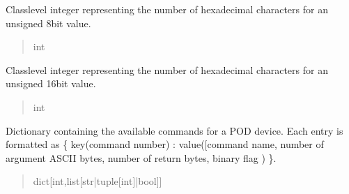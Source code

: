 \documentclass[letterpaper,10pt,english]{sphinxmanual}
\begin{document}
\begin{fulllineitems}
\begin{fulllineitems}
\begin{quote}
\begin{description}
\end{description}\end{quote}

\end{fulllineitems}


\begin{fulllineitems}
\label{\detokenize{PodCommands:PodCommands.POD_Commands.__U8}}
\pysigstartsignatures
{}
\pysigstopsignatures
\sphinxAtStartPar
Class\sphinxhyphen{}level integer representing the number of hexadecimal characters for an unsigned             8\sphinxhyphen{}bit value.
\begin{quote}\begin{description}
\sphinxAtStartPar
int

\end{description}\end{quote}

\end{fulllineitems}


\begin{fulllineitems}
\label{\detokenize{PodCommands:PodCommands.POD_Commands.__U16}}
\pysigstartsignatures
{}
\pysigstopsignatures
\sphinxAtStartPar
Class\sphinxhyphen{}level integer representing the number of hexadecimal characters for an unsigned             16\sphinxhyphen{}bit value.
\begin{quote}\begin{description}
\sphinxAtStartPar
int

\end{description}\end{quote}

\end{fulllineitems}


\begin{fulllineitems}
\label{\detokenize{PodCommands:PodCommands.POD_Commands.__commands}}
\pysigstartsignatures
{}
\pysigstopsignatures
\sphinxAtStartPar
Dictionary containing the available commands for             a POD device. Each entry is formatted as \{ key(command number) : value({[}command name, number             of argument ASCII bytes, number of return bytes, binary flag ) \}.
\begin{quote}\begin{description}
\sphinxAtStartPar
dict{[}int,list{[}str|tuple{[}int{]}|bool{]}{]}


\end{description}
\end{quote}
\end{fulllineitems}
\end{fulllineitems}
\end{document}
